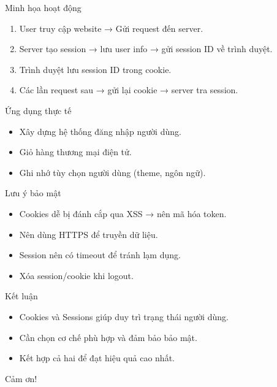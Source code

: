 \documentclass{beamer}
\begin{document}
\begin{frame}{Minh họa hoạt động}
  \begin{enumerate}
    \item User truy cập website → Gửi request đến server.
    \item Server tạo session → lưu user info → gửi session ID về trình duyệt.
    \item Trình duyệt lưu session ID trong cookie.
    \item Các lần request sau → gửi lại cookie → server tra session.
  \end{enumerate}
\end{frame}

\begin{frame}{Ứng dụng thực tế}
  \begin{itemize}
    \item Xây dựng hệ thống đăng nhập người dùng.
    \item Giỏ hàng thương mại điện tử.
    \item Ghi nhớ tùy chọn người dùng (theme, ngôn ngữ).
  \end{itemize}
\end{frame}

\begin{frame}{Lưu ý bảo mật}
  \begin{itemize}
    \item Cookies dễ bị đánh cắp qua XSS → nên mã hóa token.
    \item Nên dùng HTTPS để truyền dữ liệu.
    \item Session nên có timeout để tránh lạm dụng.
    \item Xóa session/cookie khi logout.
  \end{itemize}
\end{frame}

\begin{frame}{Kết luận}
  \begin{itemize}
    \item Cookies và Sessions giúp duy trì trạng thái người dùng.
    \item Cần chọn cơ chế phù hợp và đảm bảo bảo mật.
    \item Kết hợp cả hai để đạt hiệu quả cao nhất.
  \end{itemize}
\end{frame}

\begin{frame}
  \centering
  \Huge Cảm ơn!
\end{frame}
\end{document}
